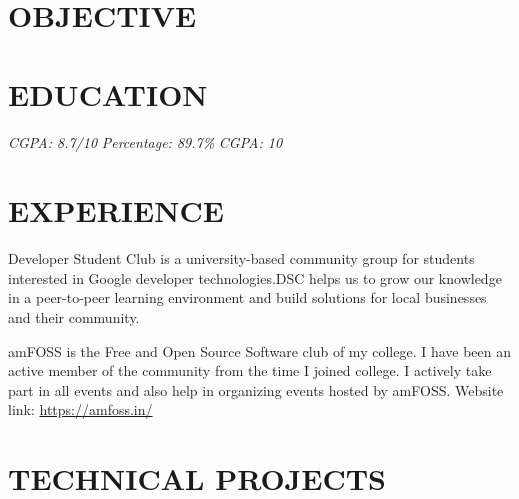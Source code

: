 \documentclass[11pt,a4paper,sans]{moderncv}        %
\begin{document}
\makecvtitle

\section{OBJECTIVE}

\section{EDUCATION}
{\textit{CGPA: 8.7/10}}{}  %
{\textit{Percentage: 89.7\%  }}{}  %
{\textit{CGPA: 10 }}{}  %

\section{EXPERIENCE}

{Developer Student Club is a university-based community group for students interested in Google developer technologies.DSC helps us to grow our knowledge in a peer-to-peer learning environment and build solutions for local businesses and their community.}


{amFOSS is the Free and Open Source Software club of my college. I have been an active member of the community from the time I joined college. I actively take part in all events and also help in organizing events hosted by amFOSS. Website link:
{\newline}
\url{https://amfoss.in/}}%

\section{TECHNICAL PROJECTS}
\end{document}
